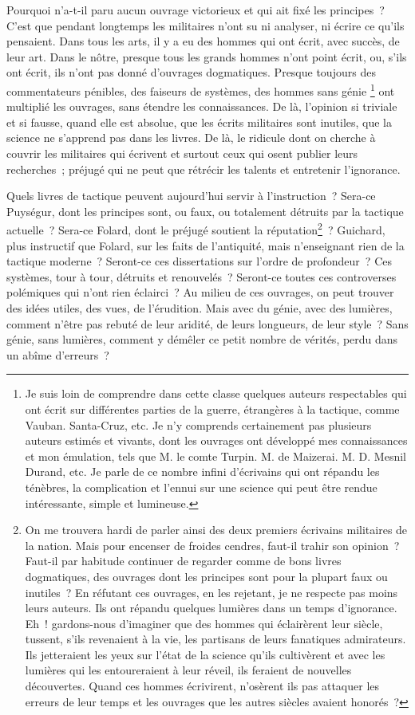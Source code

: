 \documentclass[french,twoside]{book} %
\begin{document}
Pourquoi n’a-t-il paru aucun ouvrage victorieux et qui ait fixé les principes ? C’est que pendant longtemps les militaires n’ont su ni analyser, ni écrire ce qu’ils pensaient. Dans tous les arts, il y a eu des hommes qui ont écrit, avec succès, de leur art. Dans le nôtre, presque tous les grands hommes n’ont point écrit, ou, s’ils ont écrit, ils n’ont pas donné d’ouvrages dogmatiques. Presque toujours des commentateurs pénibles, des faiseurs de systèmes, des hommes sans génie
\label{footnote3}\footnote{Je suis loin de comprendre dans cette classe quelques auteurs respectables qui ont écrit sur différentes parties de la guerre, étrangères à la tactique, comme Vauban. Santa-Cruz, etc. Je n’y comprends certainement pas plusieurs auteurs estimés et vivants, dont les ouvrages ont développé mes connaissances et mon émulation, tels que M. le comte Turpin. M. de Maizerai. M. D. Mesnil Durand, etc. Je parle de ce nombre infini d’écrivains qui ont répandu les ténèbres, la complication et l’ennui sur une science qui peut être rendue intéressante, simple et lumineuse.} ont multiplié les ouvrages, sans étendre les connaissances. De là, l’opinion si triviale et si fausse, quand elle est absolue, que les écrits militaires sont inutiles, que la science ne s’apprend pas dans les livres. De là, le ridicule dont on cherche à couvrir les militaires qui écrivent et surtout ceux qui osent publier leurs recherches ; préjugé qui ne peut que rétrécir les talents et entretenir l’ignorance.\par
Quels livres de tactique peuvent aujourd’hui servir à l’instruction ? Sera-ce Puységur, dont les principes sont, ou faux, ou totalement détruits par la tactique actuelle ? Sera-ce Folard, dont le préjugé soutient la réputation\footnote{On me trouvera hardi de parler ainsi des deux premiers écrivains militaires de la nation. Mais pour encenser de froides cendres, faut-il trahir son opinion ? Faut-il par habitude continuer de regarder comme de bons livres dogmatiques, des ouvrages dont les principes sont pour la plupart faux ou inutiles ? En réfutant ces ouvrages, en les rejetant, je ne respecte pas moins leurs auteurs. Ils ont répandu quelques lumières dans un temps d’ignorance. Eh ! gardons-nous d’imaginer que des hommes qui éclairèrent leur siècle, tussent, s’ils revenaient à la vie, les partisans de leurs fanatiques admirateurs. Ils jetteraient les yeux sur l’état de la science qu’ils cultivèrent et avec les lumières qui les entoureraient à leur réveil, ils feraient de nouvelles découvertes. Quand ces hommes écrivirent, n’osèrent ils pas attaquer les erreurs de leur temps et les ouvrages que les autres siècles avaient honorés ?} ? Guichard, plus instructif que Folard, sur les faits de l’antiquité, mais n’enseignant rien de la tactique moderne ? Seront-ce ces dissertations sur l’ordre de profondeur ? Ces systèmes, tour à tour, détruits et renouvelés ? Seront-ce toutes ces controverses polémiques qui n’ont rien éclairci ? Au milieu de ces ouvrages, on peut trouver des idées utiles, des vues, de l’érudition. Mais avec du génie, avec des lumières, comment n’être pas rebuté de leur aridité, de leurs longueurs, de leur style ? Sans génie, sans lumières, comment y démêler ce petit nombre de vérités, perdu dans un abîme d’erreurs ?\par
\end{document}
